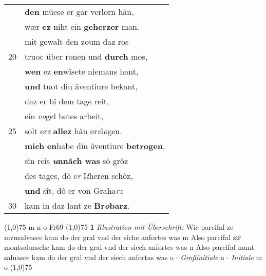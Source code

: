\documentclass[8pt,a4paper,notitlepage]{article}
\begin{document}
\begin{table}[ht]
\begin{minipage}[t]{0.5\linewidth}
\begin{tabular}{rl}
 & \textbf{den} müese er gar verlorn hân,\\ 
 & wær \textbf{ez} niht ein \textbf{geherzer} man.\\ 
 & mit gewalt den zoum daz ros\\ 
20 & truoc über ronen und \textbf{durch} mos,\\ 
 & \textbf{wen} ez \textbf{en}wîsete niemans hant,\\ 
 & \textbf{und} tuot diu âventiure bekant,\\ 
 & daz er bî dem tage reit,\\ 
 & ein \textit{vo}gel hetes arbeit,\\ 
25 & solt er\textit{z} \textbf{allez} hân er\textit{v}l\textit{o}gen.\\ 
 & \textbf{mich} \textbf{en}habe diu âventiure \textbf{betrogen},\\ 
 & sîn reis \textbf{\textit{u}nnâch was} sô grôz\\ 
 & des tages, dô e\textit{r} I\textit{t}heren schôz,\\ 
 & \textbf{und} sît, dô er von Graha\textit{rz}\\ 
30 & kam in daz lant ze \textbf{Br\textit{o}barz}.\\ 
\end{tabular}
\scriptsize
\line(1,0){75} \newline
m n o Fr69 \newline
\line(1,0){75} \newline
\textbf{1} \textit{Illustration mit Überschrift:} Wie parcifal ze mvnsalvasce kam do der gral vnd der siche anfortes was m  Also parcifal zuͦ montsaluasche kam do der gral vnd der siech anfortes was n  Also parcifal munt saluasce kam do der gral vnd der siech anfortas was o   $\cdot$ \textit{Großinitiale} n   $\cdot$ \textit{Initiale} m o  \newline
\line(1,0){75} \newline

\end{minipage}
\end{table}
\end{document}
